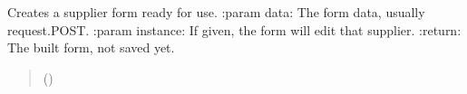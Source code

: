 \documentclass[a4paper,11pt,spanish]{sphinxmanual}
\begin{document}
\begin{fulllineitems}
\label{\detokenize{api/supplier/supplier.services:supplier.services.build_supplier_form}}
\pysigstartsignatures
\pysiglinewithargsret
{}
{\sphinxparamcomma {}}
{}
\pysigstopsignatures
\sphinxAtStartPar
Creates a supplier form ready for use.
:param data: The form data, usually request.POST.
:param instance: If given, the form will edit that supplier.
:return: The built form, not saved yet.
\begin{quote}\begin{description}
\sphinxAtStartPar
{} ({\hyperref[\detokenize{api/supplier/supplier.models:supplier.models.Supplier}]{}}\sphinxstyleliteralemphasis{\sphinxupquote{ | }})

\sphinxAtStartPar
{\hyperref[\detokenize{api/supplier/supplier.forms:supplier.forms.SupplierForm}]{}}

\end{description}\end{quote}

\end{fulllineitems}

\end{document}
